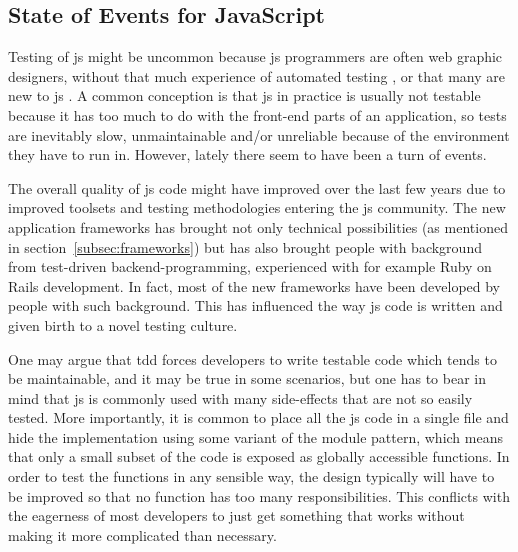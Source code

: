 \documentclass[11pt]{article}
\begin{document}
\subsection{State of Events for JavaScript}
\label{subsec:stateofevents}

Testing of \gls{js} might be uncommon because \gls{js} programmers are often web graphic designers, without that much experience of automated testing \cite[question~10]{Stenmark}, or that many are new to \gls{js} \cite[question~16]{Ekelof}. A common conception is that \gls{js} in practice is usually not testable because it has too much to do with the front-end parts of an application, so tests are inevitably slow, unmaintainable and/or unreliable because of the environment they have to run in. However, lately there seem to have been a turn of events.

The overall quality of \gls{js} code might have improved over the last few years due to improved toolsets and testing methodologies entering the \gls{js} community. The new application frameworks has brought not only technical possibilities (as mentioned in section~\ref{subsec:frameworks}) but has also brought people with background from test-driven backend-programming, experienced with for example Ruby on Rails development. In fact, most of the new frameworks have been developed by people with such background. This has influenced the way \gls{js} code is written and given birth to a novel testing culture. \cite[questions~12-15]{Ahnve}

One may argue that \gls{tdd} forces developers to write testable code which tends to be maintainable, and it may be true in some scenarios, but one has to bear in mind that \gls{js} is commonly used with many side-effects that are not so easily tested. More importantly, it is common to place all the \gls{js} code in a single file and hide the implementation using some variant of the module pattern\cite[p.~40]{GoodParts}, which means that only a small subset of the code is exposed as globally accessible functions. In order to test the functions in any sensible way, the design typically will have to be improved so that no function has too many responsibilities. This conflicts with the eagerness of most developers to just get something that works without making it more complicated than necessary.
\end{document}

